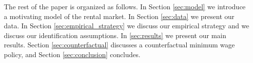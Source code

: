 The rest of the paper is organized as follows.
In Section \ref{sec:model} we introduce a motivating model of the rental market.
In Section \ref{sec:data} we present our data.
In Section \ref{sec:empirical_strategy} we discuss our empirical strategy and
we discuss our identification assumptions.
In \ref{sec:results} we present our main results.
Section \ref{sec:counterfactual} discusses a counterfactual minimum wage policy, and
Section \ref{sec:conclusion} concludes.
